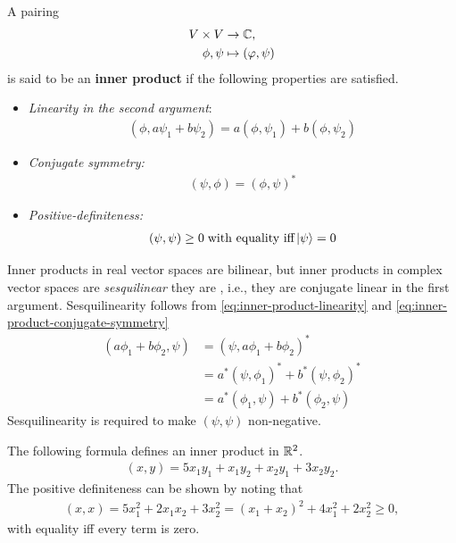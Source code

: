 \begin{definition}
A pairing
	\begin{align}
		V\times V &\to\mathbb C, \\
		\phi,\psi &\mapsto (\varphi,\psi)
	\end{align}
is said to be an {\bf inner product} if the following properties are satisfied.
	\begin{itemize}
		\item \emph{Linearity in the second argument}: 
		\begin{align}
			(\phi, a\psi_1 + b\psi_2) = a(\phi,\psi_1) + b(\phi,\psi_2) 
			\label{eq:inner-product-linearity}
		\end{align}
		\item \emph{Conjugate symmetry:}
		\begin{align}
			(\psi,\phi) = (\phi,\psi)^*
			\label{eq:inner-product-conjugate-symmetry} 
		\end{align}
		\item \emph{Positive-definiteness:} 
		\begin{align}
			(\psi,\psi) \ge 0 \;\textrm{with equality iff} \ket{\psi} = 0 
			\label{eq:inner-product-+ve-definite}
		\end{align}
	\end{itemize}
\end{definition}



Inner products in real vector spaces are bilinear, but inner products in complex vector spaces are  \emph{sesquilinear} they are , i.e., they are conjugate linear in the first argument. Sesquilinearity follows from \eqref{eq:inner-product-linearity} and \eqref{eq:inner-product-conjugate-symmetry}
\begin{align}
	(a\phi_1 + b\phi_2,\psi) &= (\psi,a\phi_1 + b\phi_2)^* \\
		&= a^*(\psi,\phi_1)^* + b^*(\psi,\phi_2)^* \\
		&= a^* (\phi_1,\psi) + b^*(\phi_2,\psi) 
\end{align}
Sesquilinearity is required to make $(\psi,\psi)$ non-negative. %

\begin{example}\leavevmode
	
	The following formula defines an inner product in $\mathbb R^2$.
	\begin{align}
		(x,y) = 5x_1y_1 + x_1y_2 + x_2y_1 + 3x_2y_2.
	\end{align}
	The positive definiteness can be shown by noting that
	\begin{align}
		(x,x) = 5x_1^2 + 2x_1x_2 + 3x_2^2 = (x_1+x_2)^2 + 4x_1^2 + 2x_2^2 \ge 0,
	\end{align}
	with equality iff every term is zero.
\end{example}

